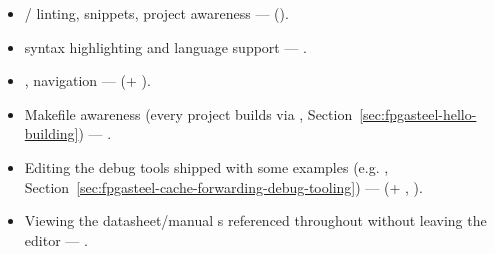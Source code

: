 {\footnotesize
\begin{itemize}
    \item {}/ linting, snippets, project awareness ---  ().
    \item {} syntax highlighting and language support --- .
    \item {} , navigation ---  (+ ).
    \item Makefile awareness (every  project builds via , Section~\ref{sec:fpgasteel-hello-building}) --- .
    \item Editing the  debug tools shipped with some examples (e.g. , Section~\ref{sec:fpgasteel-cache-forwarding-debug-tooling}) ---  (+ , ).
    \item Viewing the datasheet/manual s referenced throughout  without leaving the editor --- .
\end{itemize}
}

